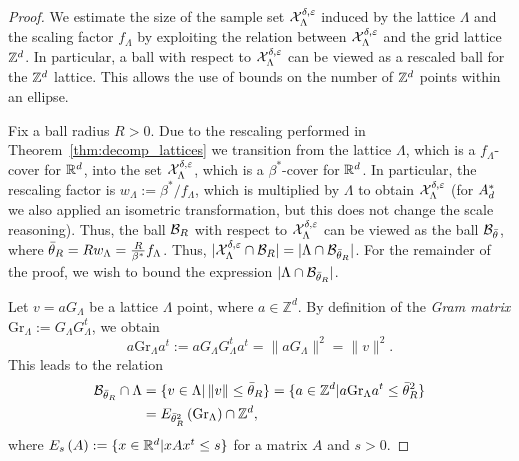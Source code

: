 \begin{proof}
  We estimate the size of the sample set $\mathcal{X}_{\Lambda}^{\delta,\varepsilon}$ induced by the lattice $\Lambda$ and the scaling factor $f_\Lambda$ by exploiting the relation between $\mathcal{X}_{\Lambda}^{\delta,\varepsilon}$ and the grid lattice~$\mathbb{Z}^d$. In particular, a ball with respect to $\mathcal{X}_{\Lambda}^{\delta,\varepsilon}$ can be viewed as a rescaled ball for the  $\mathbb{Z}^d$ lattice. This allows the use of bounds on the number of $\mathbb{Z}^d$ points within an ellipse. 

  Fix a ball radius $R>0$. 
  Due to the rescaling performed in Theorem~\ref{thm:decomp_lattices}  we transition from the lattice $\Lambda$, which is a $f_\Lambda$-cover for $\mathbb{R}^d$, into the set $\mathcal{X}_{\Lambda}^{\delta,\varepsilon}$, which is a ${\beta^*}$-cover for $\mathbb{R}^d$. In particular, the rescaling factor is $w_\Lambda:={\beta^*}/f_\Lambda$, which is multiplied by $\Lambda$ to obtain $\mathcal{X}_{\Lambda}^{\delta,\varepsilon}$ (for $A_d^*$ we also applied an isometric transformation, but this does not change the scale reasoning). Thus, the ball $\mathcal{B}_R$ with respect to $\mathcal{X}_{\Lambda}^{\delta,\varepsilon}$ can be viewed as the ball $\mathcal{B}_{\Bar{\theta}}$, where $\Bar{\theta}_R=R w_\Lambda=\frac{R}{{\beta^*}}f_\Lambda$. Thus, $|\mathcal{X}_{\Lambda}^{\delta,\varepsilon}\cap \mathcal{B}_R|=|\Lambda\cap\mathcal{B}_{\Bar{\theta}_R}|$. For the remainder of the proof, we wish to bound the expression $|\Lambda\cap\mathcal{B}_{\Bar{\theta}_R}|$.

  Let $v=aG_\Lambda$ be a lattice $\Lambda$ point, where $a\in\mathbb{Z}^d$. By definition of the \emph{Gram matrix} $\text{Gr}_\Lambda:=G_\Lambda G_\Lambda^t$, we obtain 
  \[
    a\text{Gr}_\Lambda a^t:=aG_\Lambda G^t_\Lambda a^t=\|aG_\Lambda\|^2=\|v\|^2.
  \]
This leads to the relation
  \begin{align*}
      \mathcal{B}_{\Bar{\theta}_R}\cap \Lambda &= \{v\in\Lambda |\,\|v\| \leq \Bar{\theta}_R\} =\{a\in\mathbb{Z}^d|a \text{Gr}_\Lambda a^t\leq \Bar{\theta}_R^2\} \\ & =E_{\Bar{\theta}_R^2}\left(\text{Gr}_\Lambda\right)\cap \mathbb{Z}^d,
  \end{align*}
  where $E_{s}\left(A\right):=\{x\in\mathbb{R}^d|x A x^t\leq s\}$ for a matrix $A$ and $s>0$. 
  

\end{proof}
